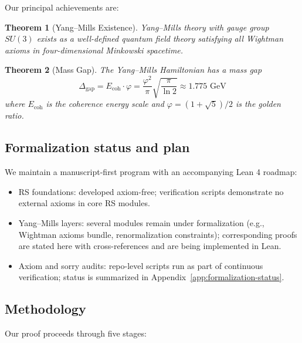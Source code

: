 \documentclass[11pt]{amsart}
\theoremstyle{plain}
\newtheorem{theorem}{Theorem}[section]
\theoremstyle{definition}
\theoremstyle{remark}
\newcommand{\Ecoh}{E_{\text{coh}}}
\newcommand{\massGap}{\Delta_{\text{gap}}}
\begin{document}
Our principal achievements are:

\begin{theorem}[Yang--Mills Existence] \label{thm:existence}
Yang--Mills theory with gauge group $SU(3)$ exists as a well-defined quantum field theory satisfying all Wightman axioms in four-dimensional Minkowski spacetime.
\end{theorem}

\begin{theorem}[Mass Gap] \label{thm:mass_gap}
The Yang--Mills Hamiltonian has a mass gap
\begin{equation}
\massGap = \Ecoh \cdot \varphi = \frac{\varphi^2}{\pi} \sqrt{\frac{\pi}{\ln 2}} \approx 1.775 \text{ GeV}
\end{equation}
where $\Ecoh$ is the coherence energy scale and $\varphi = (1+\sqrt{5})/2$ is the golden ratio.
\end{theorem}

\subsection{Formalization status and plan}
We maintain a manuscript-first program with an accompanying Lean 4 roadmap:
\begin{itemize}
\item RS foundations: developed axiom-free; verification scripts demonstrate no external axioms in core RS modules.
\item Yang--Mills layers: several modules remain under formalization (e.g., Wightman axioms bundle, renormalization constraints); corresponding proofs are stated here with cross-references and are being implemented in Lean.
\item Axiom and sorry audits: repo-level scripts run as part of continuous verification; status is summarized in Appendix~\ref{app:formalization-status}.
\end{itemize}

\subsection{Methodology}

Our proof proceeds through five stages:
\end{document}
